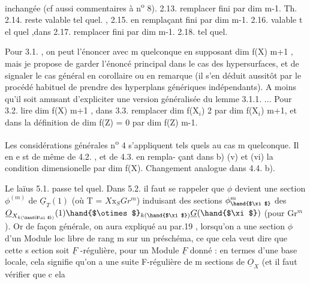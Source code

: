 
inchangée (cf aussi  commentaires à n\textsuperscript{o} 8). 2.13. remplacer fini
par dim \hand{$\leqslant$} m-1. Th. 2.14. reste valable tel quel. , 2.15. en
remplaçant fini par dim \hand{$\leqslant$} m-1. 2.16. valable t el quel ,dans
 2.17. remplacer fini par dim \hand{$\leqslant$} m-1. 2.18. tel quel.

Pour 3.1. , on peut l'énoncer avec m quelconque en supposant
dim f(X) \hand{$\geqslant$} m+1 , mais je propose de garder l'énoncé principal dans
le cas des hypersurfaces, et de signaler le cas général en corollaire
ou en remarque (il s'en déduit aussitôt par le procédé habituel de
prendre des hyperplans génériques indépendants). A moins qu'il soit
amusant d'expliciter une version généralisée du lemme 3.1.1. ...
Pour 3.2. lire dim f(X)\hand{$\geqslant$} m+1 , dans 3.3. remplacer dim f(X$_i$) \hand{$\geqslant$} 2
par dim f(X$_i$)\hand{$\geqslant$} m+1, et dans la définition de  dim f(Z) = 0
par dim f(Z) \hand{$\leqslant$} m-1.

Les considérations générales  n\textsuperscript{o} 4 s'appliquent tels quels
au cas m quelconque. Il en e st de même de 4.2. , et de 4.3. en rempla-%
çant dans b) (v) et (vi) la condition dimensionelle par
dim f(X). Changement analogue dans 4.4. b).

Le laïus 5.1. passe tel quel. Dans 5.2. il faut se rappeler
que $\phi$ devient une section $\phi^{(m)}$ de $\underline{G}_T(1)$ (où T 
 = $X\mathrm{x}_S Gr^m$)  induisant des sections
$\phi^m_{\hand{$\xi$}}$ des   $\underline{O}_{X_{k(\hand{$\xi$})}}(1)\hand{$\otimes$}_{k(\hand{$\xi$})}\underline{G}(\hand{$\xi$})$ (pour \hand{$\xi \in$} Gr$^m$). Or
de façon générale, on aura expliqué au par.19 , lorsqu'on a une
\margin{$\|$} section $\phi$ d'un Module loc libre de rang m sur un préschéma, ce que
\margin{$\|$} cela veut dire que cette s ection soit $\underline{F}$ -régulière, pour un Module
\margin{$\|$} $\underline{F}$ donné : en termes d'une base locale, cela signifie qu'on a une
\margin{$\|$} suite F-régulière de m sections de $\underline{O}_X$ (et il faut vérifier que c ela

